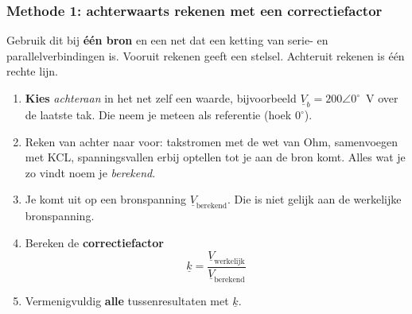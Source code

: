\documentclass[a4paper,11pt]{article}
\begin{document}
\subsubsection{Methode 1: achterwaarts rekenen met een correctiefactor}

Gebruik dit bij \textbf{één bron} en een net dat een ketting van serie- en parallelverbindingen is.
Vooruit rekenen geeft een stelsel. Achteruit rekenen is één rechte lijn.

\begin{theorie}[Werkwijze]
    \begin{enumerate}
        \item \textbf{Kies} \emph{achteraan} in het net zelf een waarde, bijvoorbeeld
              $\underline{V}_b = 200\angle 0^\circ$~V over de laatste tak. Die neem je meteen als
              referentie (hoek $0^\circ$).
        \item Reken van achter naar voor: takstromen met de wet van Ohm, samenvoegen met KCL,
              spanningsvallen erbij optellen tot je aan de bron komt. Alles wat je zo vindt noem je
              \emph{berekend}.
        \item Je komt uit op een bronspanning $\underline{V}_{\text{berekend}}$. Die is
              niet gelijk aan de werkelijke bronspanning.
        \item Bereken de \textbf{correctiefactor}
              \[\underline{k} = \frac{\underline{V}_{\text{werkelijk}}}{\underline{V}_{\text{berekend}}}\]
        \item Vermenigvuldig \textbf{alle} tussenresultaten met $\underline{k}$.
    \end{enumerate}
\end{theorie}
\end{document}
